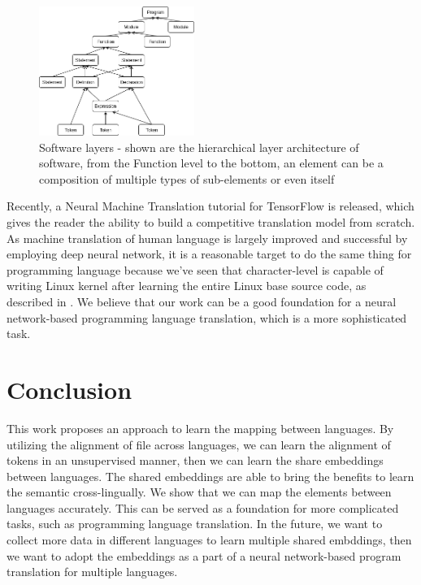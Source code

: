 \begin{figure}[t!]
	\includegraphics[width=0.45\textwidth]{software_layers}
	\caption{Software layers - shown are the hierarchical layer architecture of software, from the Function level to the bottom, an element can be a composition of multiple types of sub-elements or even itself}
	\medskip
	\label{fig:clf}
\end{figure}

Recently, a Neural Machine Translation tutorial \cite{Thang} for TensorFlow is released, which gives the reader the ability to build a competitive translation model from scratch. As machine translation of human language is largely improved and successful by employing deep neural network, it is a reasonable target to do the same thing for programming language because we've seen that character-level is capable of writing Linux kernel after learning the entire Linux base source code, as described in \cite{Karpathy}. We believe that our work can be a good foundation for a neural network-based programming language translation, which is a more sophisticated task. 

\section{Conclusion}
This work proposes an approach to learn the mapping between languages. By utilizing the alignment of file across languages, we can learn the alignment of tokens in an unsupervised manner, then we can learn the share embeddings between languages. The shared embeddings are able to bring the benefits to learn the semantic cross-lingually. We show that we can map the elements between languages accurately. This can be served as a foundation for more complicated tasks, such as programming language translation. In the future, we want to collect more data in different languages to learn multiple shared embddings, then we want to adopt the embeddings as a part of a neural network-based program translation for multiple languages. 



\begin{acks}

\end{acks}
